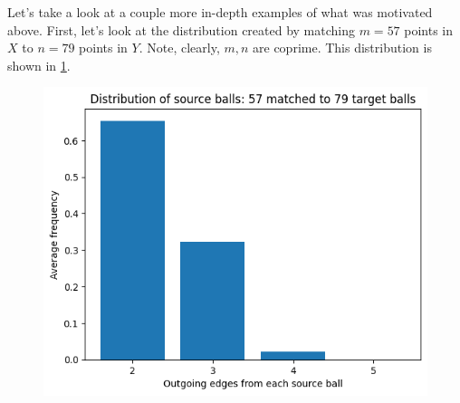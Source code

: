 \documentclass[12pt]{article}%
\theoremstyle{plain}
\begin{document}
Let's take a look at a couple more in-depth examples of what was motivated above. First, let's look at the distribution created by matching $m=57$ points in $X$ to $n=79$ points in $Y$. Note, clearly, $m,n$ are coprime. This distribution is shown in \ref{fig: A}.
\begin{figure}
  \centering
  \hspace*{0cm}\includegraphics[width=1\textwidth,height=\textwidth,keepaspectratio]{images/57-79.png}
  \caption{}
  \label{fig: A}
\end{figure}







\end{document}
